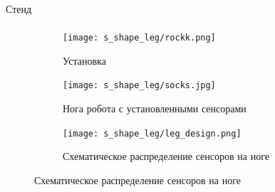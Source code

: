 \begin{frame}[t]{Стенд}
    \framesubtitle{}
    \begin{figure}[H]
        \begin{subfigure}{0.33\textwidth}
            \centering\texttt{[image: s\_shape\_leg/rockk.png]}
            \caption{Установка}
        \end{subfigure}
        \begin{subfigure}{0.33\textwidth}
            \centering\texttt{[image: s\_shape\_leg/socks.jpg]}
            \caption{Нога робота с установленными сенсорами}
        \end{subfigure}
        \begin{subfigure}{0.33\textwidth}
            \centering\texttt{[image: s\_shape\_leg/leg\_design.png]}
            \caption{Схематическое распределение сенсоров на ноге}
        \end{subfigure}
    \end{figure}
\end{frame}


